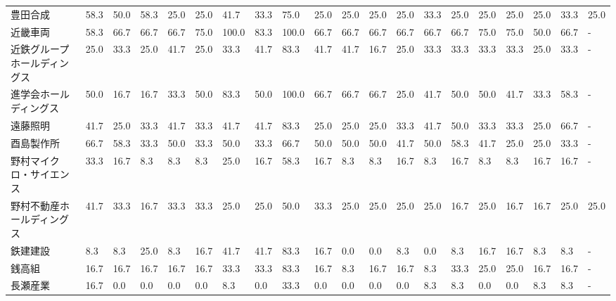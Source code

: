 \begin{tabular}{llllllllllllllllllll}
豊田合成            &   58.3 &   50.0 &      58.3 &      25.0 &       25.0 &   41.7 &   33.3 &   75.0 &    25.0 &    25.0 &   25.0 &  25.0 &   33.3 &    25.0 &    25.0 &  25.0 &  25.0 &  33.3 &  25.0 \\
近畿車両            &   58.3 &   66.7 &      66.7 &      66.7 &       75.0 &  100.0 &   83.3 &  100.0 &    66.7 &    66.7 &   66.7 &  66.7 &   66.7 &    66.7 &    75.0 &  75.0 &  50.0 &  66.7 &     - \\
近鉄グループホールディングス  &   25.0 &   33.3 &      25.0 &      41.7 &       25.0 &   33.3 &   41.7 &   83.3 &    41.7 &    41.7 &   16.7 &  25.0 &   33.3 &    33.3 &    33.3 &  33.3 &  25.0 &  33.3 &     - \\
進学会ホールディングス     &   50.0 &   16.7 &      16.7 &      33.3 &       50.0 &   83.3 &   50.0 &  100.0 &    66.7 &    66.7 &   66.7 &  25.0 &   41.7 &    50.0 &    50.0 &  41.7 &  33.3 &  58.3 &     - \\
遠藤照明            &   41.7 &   25.0 &      33.3 &      41.7 &       33.3 &   41.7 &   41.7 &   83.3 &    25.0 &    25.0 &   25.0 &  33.3 &   41.7 &    50.0 &    33.3 &  33.3 &  25.0 &  66.7 &     - \\
酉島製作所           &   66.7 &   58.3 &      33.3 &      50.0 &       33.3 &   50.0 &   33.3 &   66.7 &    50.0 &    50.0 &   50.0 &  41.7 &   50.0 &    58.3 &    41.7 &  25.0 &  25.0 &  33.3 &     - \\
野村マイクロ・サイエンス    &   33.3 &   16.7 &       8.3 &       8.3 &        8.3 &   25.0 &   16.7 &   58.3 &    16.7 &     8.3 &    8.3 &  16.7 &    8.3 &    16.7 &     8.3 &   8.3 &  16.7 &  16.7 &     - \\
野村不動産ホールディングス   &   41.7 &   33.3 &      16.7 &      33.3 &       33.3 &   25.0 &   25.0 &   50.0 &    33.3 &    25.0 &   25.0 &  25.0 &   25.0 &    16.7 &    25.0 &  16.7 &  16.7 &  25.0 &  25.0 \\
鉄建建設            &    8.3 &    8.3 &      25.0 &       8.3 &       16.7 &   41.7 &   41.7 &   83.3 &    16.7 &     0.0 &    0.0 &   8.3 &    0.0 &     8.3 &    16.7 &  16.7 &   8.3 &   8.3 &     - \\
銭高組             &   16.7 &   16.7 &      16.7 &      16.7 &       16.7 &   33.3 &   33.3 &   83.3 &    16.7 &     8.3 &   16.7 &  16.7 &    8.3 &    33.3 &    25.0 &  25.0 &  16.7 &  16.7 &     - \\
長瀬産業            &   16.7 &    0.0 &       0.0 &       0.0 &        0.0 &    8.3 &    0.0 &   33.3 &     0.0 &     0.0 &    0.0 &   0.0 &    8.3 &     8.3 &     0.0 &   0.0 &   8.3 &   8.3 &     - \\

\end{tabular}
